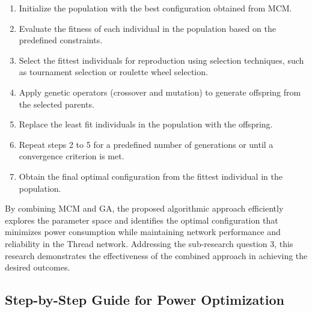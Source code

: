 \begin{enumerate}
    \item Initialize the population with the best configuration obtained from \gls{MCM}.
    \item Evaluate the fitness of each individual in the population based on the predefined constraints.
    \item Select the fittest individuals for reproduction using selection techniques, such as tournament selection or roulette wheel selection.
    \item Apply genetic operators (crossover and mutation) to generate offspring from the selected parents.
    \item Replace the least fit individuals in the population with the offspring.
    \item Repeat steps 2 to 5 for a predefined number of generations or until a convergence criterion is met.
    \item Obtain the final optimal configuration from the fittest individual in the population.
\end{enumerate}

By combining \gls{MCM} and \gls{GA}, the proposed algorithmic approach efficiently explores the parameter space and identifies the optimal configuration that minimizes power consumption while maintaining network performance and reliability in the Thread network. Addressing the sub-research question 3, this research demonstrates the effectiveness of the combined approach in achieving the desired outcomes.

\subsection{Step-by-Step Guide for Power Optimization}

